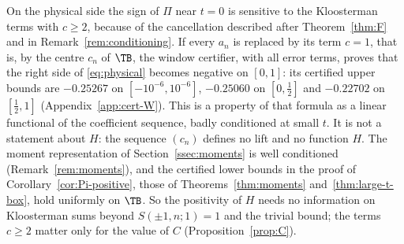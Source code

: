 \begin{remark}\label{rem:negctl}
On the physical side the sign of $\Pi$ near $t=0$ is sensitive to the Kloosterman terms with $c\ge2$, because of the cancellation described after
Theorem~\ref{thm:F} and in Remark~\ref{rem:conditioning}. If every $a_n$ is replaced by its term $c=1$, that is, by the centre $c_n$ of $\TB$, the
window certifier, with all error terms, proves that the right side of \eqref{eq:physical} becomes negative on $[0,1]$: its certified upper
bounds are $-0.25267$ on $[-10^{-6},10^{-6}]$, $-0.25060$ on $[0,\frac12]$ and $-0.22702$ on $[\frac12,1]$ (Appendix~\ref{app:cert-W}). This is a
property of that formula as a linear functional of the coefficient sequence, badly conditioned at small $t$. It is not a statement about $H$:
the sequence $(c_n)$ defines no lift and no function $H$. The moment representation of Section~\ref{ssec:moments} is well conditioned
(Remark~\ref{rem:moments}), and the certified lower bounds in the proof of Corollary~\ref{cor:Pi-positive}, those of Theorems~\ref{thm:moments}
and~\ref{thm:large-t-box}, hold uniformly on $\TB$. So the positivity of $H$ needs no information on Kloosterman sums beyond $S(\pm1,n;1)=1$ and
the trivial bound; the terms $c\ge2$ matter only for the value of $C$ (Proposition~\ref{prop:C}).
\end{remark}

